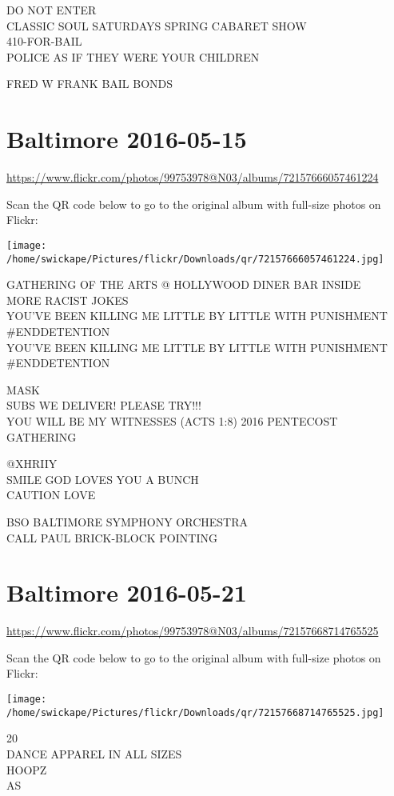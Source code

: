 \documentclass[10pt,letterpaper]{article}
\begin{document}
DO NOT ENTER\\
CLASSIC SOUL SATURDAYS SPRING CABARET SHOW\\
410{-}FOR{-}BAIL\\
POLICE AS IF THEY WERE YOUR CHILDREN

FRED W FRANK BAIL BONDS


\section*{Baltimore 2016-05-15}

\url{https://www.flickr.com/photos/99753978@N03/albums/72157666057461224}

Scan the QR code below to go to the original album with full-size photos on Flickr:

\texttt{[image: /home/swickape/Pictures/flickr/Downloads/qr/72157666057461224.jpg]}


GATHERING OF THE ARTS @ HOLLYWOOD DINER BAR INSIDE\\
MORE RACIST JOKES\\
YOU'VE BEEN KILLING ME LITTLE BY LITTLE WITH PUNISHMENT \#ENDDETENTION\\
YOU'VE BEEN KILLING ME LITTLE BY LITTLE WITH PUNISHMENT \#ENDDETENTION

MASK\\
SUBS WE DELIVER!  PLEASE TRY!!!\\
YOU WILL BE MY WITNESSES (ACTS 1:8) 2016 PENTECOST GATHERING

@XHRIIY\\
SMILE GOD LOVES YOU A BUNCH\\
CAUTION LOVE

BSO BALTIMORE SYMPHONY ORCHESTRA\\
CALL PAUL BRICK{-}BLOCK POINTING


\section*{Baltimore 2016-05-21}

\url{https://www.flickr.com/photos/99753978@N03/albums/72157668714765525}

Scan the QR code below to go to the original album with full-size photos on Flickr:

\texttt{[image: /home/swickape/Pictures/flickr/Downloads/qr/72157668714765525.jpg]}


20\\
DANCE APPAREL IN ALL SIZES\\
HOOPZ\\
AS
\end{document}
